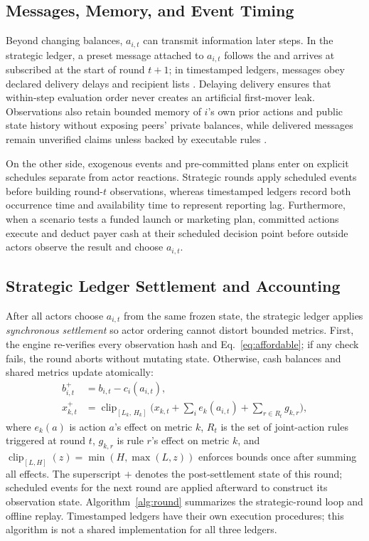 \subsection{ Messages,  Memory, and Event Timing}\label{sec:messages}
Beyond changing balances, $a_{i,t}$ can transmit information  later
steps. In the strategic ledger, a preset message attached to $a_{i,t}$ follows
the  and arrives at subscribed  at the
start of round $t+1$; in timestamped ledgers, messages obey declared delivery
delays and recipient lists . Delaying delivery ensures that within-step
evaluation order never creates an artificial first-mover leak. Observations
also retain bounded memory of  $i$'s own prior actions and public state
history without exposing peers' private balances, while delivered  messages
remain unverified claims unless backed by executable rules
\cite{polak15,polak18}.

On the other side, exogenous events and pre-committed plans enter on
explicit schedules separate from actor reactions. Strategic rounds apply
scheduled events before building round-$t$ observations, whereas timestamped
ledgers record both occurrence time and availability time to represent
reporting lag. Furthermore, when a scenario tests a funded launch or marketing
plan, committed actions execute and deduct payer cash at their scheduled
decision point before outside actors observe the result and choose $a_{i,t}$.

\subsection{Strategic Ledger Settlement and Accounting}\label{sec:settlement}
After all actors choose $a_{i,t}$ from the same frozen state, the
strategic ledger applies \textit{synchronous settlement} so actor ordering
cannot distort bounded metrics. First, the engine re-verifies every observation
hash and Eq.~\eqref{eq:affordable}; if any check fails, the round aborts
without mutating state. Otherwise, cash balances and shared metrics update
atomically:
\begin{align}
b^{+}_{i,t}&=b_{i,t}-c_i(a_{i,t}),\label{eq:cash-update}\\
x^{+}_{k,t}&=\operatorname{clip}_{[L_k,\,H_k]}\Big(x_{k,t}+\sum_{i}e_{k}(a_{i,t})+\sum_{r\in R_t}g_{k,r}\Big),\label{eq:settlement}
\end{align}
where $e_k(a)$ is action $a$'s effect on metric $k$, $R_t$ is the set of
joint-action rules triggered at round $t$, $g_{k,r}$ is rule $r$'s effect on
metric $k$, and $\operatorname{clip}_{[L,H]}(z)=\min(H,\max(L,z))$ enforces
bounds once after summing all effects. The superscript $+$ denotes the
post-settlement state of this round; scheduled events for the next round are
applied afterward to construct its observation state. Algorithm~\ref{alg:round} summarizes the
strategic-round loop and offline replay. Timestamped ledgers have their own
execution procedures; this algorithm is not a shared implementation for all
three ledgers.

